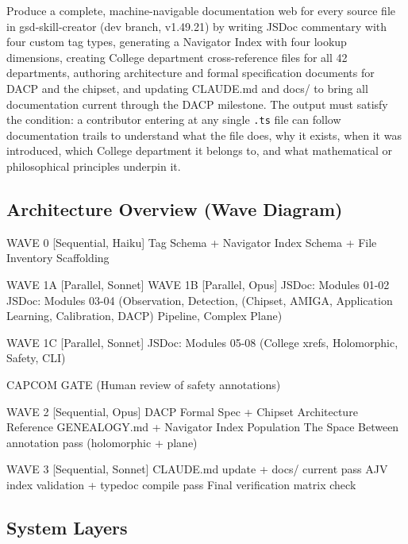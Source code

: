\documentclass[11pt,letterpaper]{article}
\begin{document}
Produce a complete, machine-navigable documentation web for every source file in gsd-skill-creator (dev branch, v1.49.21) by writing JSDoc commentary with four custom tag types, generating a Navigator Index with four lookup dimensions, creating College department cross-reference files for all 42 departments, authoring architecture and formal specification documents for DACP and the chipset, and updating CLAUDE.md and docs/ to bring all documentation current through the DACP milestone. The output must satisfy the condition: a contributor entering at any single \texttt{.ts} file can follow documentation trails to understand what the file does, why it exists, when it was introduced, which College department it belongs to, and what mathematical or philosophical principles underpin it.

\subsection{Architecture Overview (Wave Diagram)}

\begin{asciibox}
WAVE 0  [Sequential, Haiku]
  Tag Schema + Navigator Index Schema + File Inventory Scaffolding

WAVE 1A [Parallel, Sonnet]            WAVE 1B [Parallel, Opus]
  JSDoc: Modules 01-02                  JSDoc: Modules 03-04
  (Observation, Detection,              (Chipset, AMIGA, Application
   Learning, Calibration, DACP)          Pipeline, Complex Plane)

WAVE 1C [Parallel, Sonnet]
  JSDoc: Modules 05-08
  (College xrefs, Holomorphic,
   Safety, CLI)

              CAPCOM GATE (Human review of safety annotations)

WAVE 2  [Sequential, Opus]
  DACP Formal Spec + Chipset Architecture Reference
  GENEALOGY.md + Navigator Index Population
  The Space Between annotation pass (holomorphic + plane)

WAVE 3  [Sequential, Sonnet]
  CLAUDE.md update + docs/ current pass
  AJV index validation + typedoc compile pass
  Final verification matrix check
\end{asciibox}

\subsection{System Layers}
\end{document}
